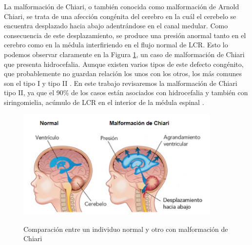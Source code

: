La malformación de Chiari, o también conocida como malformación de Arnold Chiari, se trata de una afección congénita del cerebro en la cuál el cerebelo se encuentra desplazado hacia abajo adentrándose en el canal medular. Como consecuencia de este desplazamiento, se produce una presión anormal tanto en el cerebro como en la médula interfiriendo en el flujo normal de LCR. Esto lo podemos observar claramente en la Figura \ref{fig:chiari}, un caso de malformación de Chiari que presenta hidrocefalia. Aunque existen varios tipos de este defecto congénito, que probablemente no guardan relación los unos con los otros, los más comunes son el tipo I y tipo II \cite{stanford_chiari}. En este trabajo revisaremos la malformación de Chiari tipo II, ya que el 90\% de los casos están asociados con hidrocefalia y también con siringomielia, acúmulo de LCR en el interior de la médula espinal \cite{chiari_malformaciones}.


\begin{figure}[h]
    \centering
    \includegraphics[width=0.9\textwidth]{img/Chiari.PNG}
    \caption{Comparación entre un individuo normal y otro con malformación de Chiari}
    \cite{chiari}
    \label{fig:chiari}
\end{figure}

